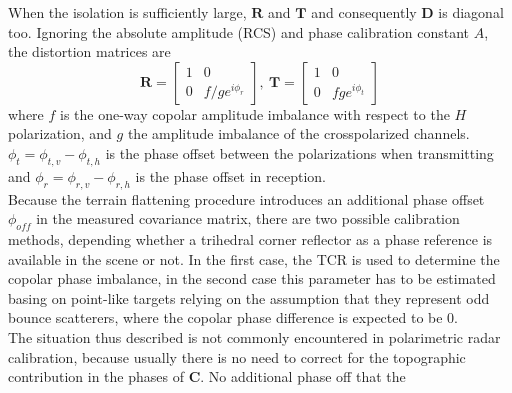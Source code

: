 When the isolation is sufficiently large, $\mathbf{R}$ and $\mathbf{T}$ and consequently $\mathbf{D}$ is diagonal too. Ignoring the absolute amplitude (RCS) and phase calibration constant $A$, the distortion matrices are
\begin{equation}
	\mathbf{R} = \begin{bmatrix}
		1 & 0\\
		0 & f/g e^{i\phi_{r}}
	\end{bmatrix},~	\mathbf{T} = \begin{bmatrix}
			1 & 0\\
			0 & f g e^{i\phi_{t}}
		\end{bmatrix}
\end{equation}
where $f$ is the one-way copolar amplitude imbalance with respect to the $H$ polarization, and $g$ the amplitude imbalance of the crosspolarized channels. $\phi_t = \phi_{t,v} -\phi_{t,h}$ is the phase offset between the polarizations when transmitting and $\phi_{r} = \phi_{r,v} -\phi_{r,h}$ is the phase offset in reception\cite{Ainsworth2006a}.\\
Because the terrain flattening procedure introduces an additional phase offset $\phi_{off}$ in the measured covariance matrix, there are two possible calibration methods, depending whether a trihedral corner reflector as a phase reference is available in the scene or not. In the first case, the TCR is used to determine the copolar phase imbalance, in the second case this parameter has to be estimated basing on point-like targets relying on the assumption that they represent odd bounce scatterers, where the copolar phase difference is expected to be 0.\\
The situation thus described is not commonly encountered in polarimetric radar calibration, because usually there is no need to correct for the topographic contribution in the phases of $\mathbf{C}$. No additional phase off that the 
